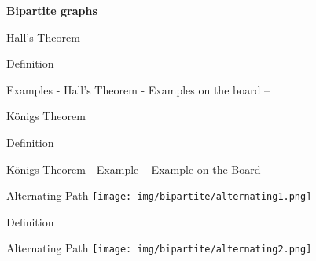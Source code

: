 \begin{frame}{}
	\centering \textbf{\huge Bipartite graphs}
\end{frame}

\begin{frame}{Hall's Theorem}
\begin{block}{Definition}
\end{block} 
\end{frame}

\begin{frame}{Examples - Hall's Theorem}
- Examples on the board --

\end{frame}
  
\begin{frame}{Königs Theorem}
\begin{block}{Definition}
\end{block} 
\end{frame}

\begin{frame}{Königs Theorem - Example}
-- Example on the Board -- 
  
\end{frame}

\begin{frame}{Alternating Path}
\centering
\texttt{[image: img/bipartite/alternating1.png]}
\begin{block}{Definition}
\end{block} 
\end{frame}

\begin{frame}{Alternating Path}
\texttt{[image: img/bipartite/alternating2.png]}
  
\end{frame}

